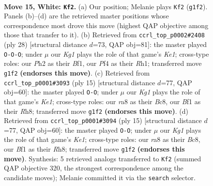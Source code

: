 \documentclass[11pt]{article}
\begin{document}
\clearpage

\begin{figure}[p]\centering
\begin{subfigure}{0.46\textwidth}\centering
\resizebox{\linewidth}{!}{%
\newchessgame
\chessboard[
  setfen={r1b1kbnr/4q3/6p1/p1ppPp1p/5P2/NP6/P3Q1PP/R1B2BKR w kq - 0 15},
  showmover=false,
  pgfstyle=straightmove, color=movearrow, markmove={g1-f2}
]}
\caption{}
\end{subfigure}\hfill
\begin{subfigure}{0.46\textwidth}\centering
\resizebox{\linewidth}{!}{%
\newchessgame
\chessboard[
  setfen={r3kb1r/ppp1qpp1/8/4Pb1p/2P5/4Q2P/PP1N1PP1/R3KB1R w KQkq - 1 15},
  showmover=false,
  pgfstyle=straightmove, color=movearrow, markmove={e1-c1}
]}
\caption{}
\end{subfigure}
\\[4pt]
\begin{subfigure}{0.46\textwidth}\centering
\resizebox{\linewidth}{!}{%
\newchessgame
\chessboard[
  setfen={rnbqk2r/pp2ppbp/2p3p1/8/B2PP3/2P5/P4PPP/R1BQK1NR b KQkq - 1 8},
  showmover=false,
  pgfstyle=straightmove, color=movearrow, markmove={e8-g8}
]}
\caption{}
\end{subfigure}\hfill
\begin{subfigure}{0.46\textwidth}\centering
\resizebox{\linewidth}{!}{%
\newchessgame
\chessboard[
  setfen={rnbqk2r/pp2ppbp/2p3p1/8/B2PP3/2P5/P4PPP/R1BQK1NR b KQkq - 1 8},
  showmover=false,
  pgfstyle=straightmove, color=movearrow, markmove={e8-g8}
]}
\caption{}
\end{subfigure}
\caption{\textbf{Move 15, White: \texttt{Kf2}.} (a) Our position; Melanie plays \texttt{Kf2} (\texttt{g1f2}). Panels (b)--(d) are the retrieved master positions whose correspondence most drove this move (highest QAP objective among those that transfer to it). (b) Retrieved from \texttt{ccrl\_top\_p0002\#2408} (ply 28) [structural distance $d$=73, QAP obj=81]: the master played \texttt{O-O-O}; under $\mu$ our \emph{Kg1} plays the role of that game's \emph{Ke1}; cross-type roles: our \emph{P}h2 as their \emph{B}f1, our \emph{P}f4 as their \emph{R}h1; transferred move \texttt{g1f2} \textbf{(endorses this move)}. (c) Retrieved from \texttt{ccrl\_top\_p0001\#3093} (ply 15) [structural distance $d$=77, QAP obj=60]: the master played \texttt{O-O}; under $\mu$ our \emph{Kg1} plays the role of that game's \emph{Ke1}; cross-type roles: our \emph{r}a8 as their \emph{B}c8, our \emph{B}f1 as their \emph{R}h8; transferred move \texttt{g1f2} \textbf{(endorses this move)}. (d) Retrieved from \texttt{ccrl\_top\_p0001\#3094} (ply 15) [structural distance $d$=77, QAP obj=60]: the master played \texttt{O-O}; under $\mu$ our \emph{Kg1} plays the role of that game's \emph{Ke1}; cross-type roles: our \emph{r}a8 as their \emph{B}c8, our \emph{B}f1 as their \emph{R}h8; transferred move \texttt{g1f2} \textbf{(endorses this move)}. Synthesis: 5 retrieved analogs transferred to \texttt{Kf2} (summed QAP objective 320, the strongest correspondence among the candidate moves); Melanie committed it via the \texttt{search} selector.}
\label{fig:thought-m28}
\end{figure}
\end{document}
